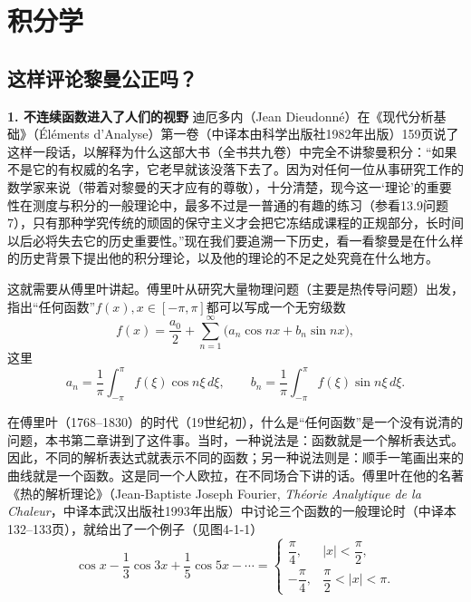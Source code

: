 \chapter{积分学}
\section{这样评论黎曼公正吗？}

\noindent\textbf{1. 不连续函数进入了人们的视野}\quad
迪厄多内（Jean Dieudonné）在《现代分析基础》（Éléments d'Analyse）第一卷（中译本由科学出版社1982年出版）159页说了这样一段话，以解释为什么这部大书（全书共九卷）中完全不讲黎曼积分：“如果不是它的有权威的名字，它老早就该没落下去了。因为对任何一位从事研究工作的数学家来说（带着对黎曼的天才应有的尊敬），十分清楚，现今这一‘理论’的重要性在测度与积分的一般理论中，最多不过是一普通的有趣的练习（参看13.9问题7），只有那种学究传统的顽固的保守主义才会把它冻结成课程的正规部分，长时间以后必将失去它的历史重要性。”现在我们要追溯一下历史，看一看黎曼是在什么样的历史背景下提出他的积分理论，以及他的理论的不足之处究竟在什么地方。

这就需要从傅里叶讲起。傅里叶从研究大量物理问题（主要是热传导问题）出发，指出“任何函数”$f(x),x\in[-\pi,\pi]$都可以写成一个无穷级数
\begin{equation}
 f(x)=\frac{a_0}{2}+\sum_{n=1}^{\infty}\bigl(a_n\cos nx+b_n\sin nx\bigr),
 \tag{1}
\end{equation}
这里
\begin{equation}
 a_n=\frac1\pi\int_{-\pi}^{\pi}f(\xi)\cos n\xi\,d\xi,
 \qquad
 b_n=\frac1\pi\int_{-\pi}^{\pi}f(\xi)\sin n\xi\,d\xi.
 \tag{2}
\end{equation}

在傅里叶（1768--1830）的时代（19世纪初），什么是“任何函数”是一个没有说清的问题，本书第二章讲到了这件事。当时，一种说法是：函数就是一个解析表达式。因此，不同的解析表达式就表示不同的函数；另一种说法则是：顺手一笔画出来的曲线就是一个函数。这是同一个人欧拉，在不同场合下讲的话。傅里叶在他的名著《热的解析理论》（Jean-Baptiste Joseph Fourier, \textit{Théorie Analytique de la Chaleur}，中译本武汉出版社1993年出版）中讨论三个函数的一般理论时（中译本132--133页），就给出了一个例子（见图4-1-1）
\begin{equation}
 \cos x-\frac13\cos3x+\frac15\cos5x-\cdots=
 \begin{cases}
 \dfrac{\pi}{4},&|x|<\dfrac{\pi}{2},\\[4pt]
 -\dfrac{\pi}{4},&\dfrac{\pi}{2}<|x|<\pi.
 \end{cases}
 \tag{3}
\end{equation}

